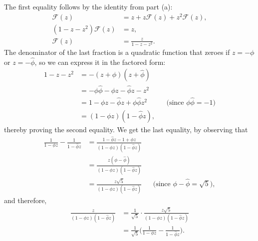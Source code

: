 The first equality follows by the identity from part (a):
\begin{align*}
	\mathcal{F}(z) &= z+z\mathcal{F}(z)+z^2\mathcal{F}(z), \\
	(1-z-z^2)\mathcal{F}(z) &= z, \\
	\mathcal{F}(z) &= \frac{z}{1-z-z^2}.
\end{align*}
The denominator of the last fraction is a quadratic function that zeroes if $z=-\phi$ or $z=-\widehat\phi$, so we can express it in the factored form:
\begin{align*}
    1-z-z^2 &= -(z+\phi)(z+\widehat\phi) \\
    &= -\phi\widehat\phi-\phi z-\widehat\phi z-z^2 \\
    &= 1-\phi z-\widehat\phi z+\phi\widehat\phi z^2 && \text{(since $\phi\widehat\phi=-1$)} \\
    &= (1-\phi z)(1-\widehat\phi z),
\end{align*}
thereby proving the second equality.
We get the last equality, by observing that
\begin{align*}
    \frac{1}{1-\phi z}-\frac{1}{1-\widehat\phi z} &= \frac{1-\widehat\phi z-1+\phi z}{(1-\phi z)(1-\widehat\phi z)} \\[1mm]
    &= \frac{z(\phi-\widehat\phi)}{(1-\phi z)(1-\widehat\phi z)} \\[1mm]
    &= \frac{z\sqrt{5}}{(1-\phi z)(1-\widehat\phi z)} && \text{(since $\phi-\widehat\phi=\sqrt{5}$)},
\end{align*}
and therefore,
\begin{align*}
    \frac{z}{(1-\phi z)(1-\widehat\phi z)} &= \frac{1}{\sqrt{5}}\cdot\frac{z\sqrt{5}}{(1-\phi z)(1-\widehat\phi z)} \\[1mm]
    &= \frac{1}{\sqrt{5}}\biggl(\frac{1}{1-\phi z}-\frac{1}{1-\widehat\phi z}\biggr).
\end{align*}
